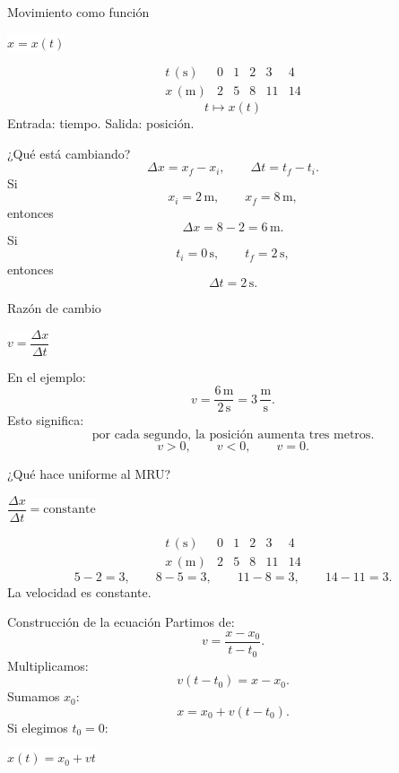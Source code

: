 \documentclass[aspectratio=169,11pt]{beamer}
\newcommand{\caja}[1]{%
  \begin{center}
  \setlength{\fboxsep}{9pt}
  \colorbox{white}{\(\displaystyle \boxed{#1}\)}
  \end{center}
}
\begin{document}
\begin{frame}{Movimiento como función}
  \caja{x=x(t)}
  \[
  \begin{array}{c|ccccc}
  t\,(\mathrm{s}) & 0 & 1 & 2 & 3 & 4\\
  \hline
  x\,(\mathrm{m}) & 2 & 5 & 8 & 11 & 14
  \end{array}
  \]
  \[
    t\longmapsto x(t)
  \]
  Entrada: tiempo. \qquad Salida: posición.
\end{frame}

\begin{frame}{¿Qué está cambiando?}
  \[
    \Delta x=x_f-x_i,
    \qquad
    \Delta t=t_f-t_i.
  \]
  Si
  \[
    x_i=2\,\mathrm{m},\qquad x_f=8\,\mathrm{m},
  \]
  entonces
  \[
    \Delta x=8-2=6\,\mathrm{m}.
  \]
  Si
  \[
    t_i=0\,\mathrm{s},\qquad t_f=2\,\mathrm{s},
  \]
  entonces
  \[
    \Delta t=2\,\mathrm{s}.
  \]
\end{frame}

\begin{frame}{Razón de cambio}
  \caja{v=\dfrac{\Delta x}{\Delta t}}
  En el ejemplo:
  \[
    v=\frac{6\,\mathrm{m}}{2\,\mathrm{s}}
    =3\,\frac{\mathrm{m}}{\mathrm{s}}.
  \]
  Esto significa:
  \[
    \text{por cada segundo, la posición aumenta tres metros}.
  \]
  \[
    v>0,\qquad v<0,\qquad v=0.
  \]
\end{frame}

\begin{frame}{¿Qué hace uniforme al MRU?}
  \caja{\dfrac{\Delta x}{\Delta t}=\text{constante}}
  \[
  \begin{array}{c|ccccc}
  t\,(\mathrm{s}) & 0 & 1 & 2 & 3 & 4\\
  \hline
  x\,(\mathrm{m}) & 2 & 5 & 8 & 11 & 14
  \end{array}
  \]
  \[
    5-2=3,\qquad 8-5=3,\qquad 11-8=3,\qquad 14-11=3.
  \]
  La velocidad es constante.
\end{frame}

\begin{frame}{Construcción de la ecuación}
  Partimos de:
  \[
    v=\frac{x-x_0}{t-t_0}.
  \]
  Multiplicamos:
  \[
    v(t-t_0)=x-x_0.
  \]
  Sumamos \(x_0\):
  \[
    x=x_0+v(t-t_0).
  \]
  Si elegimos \(t_0=0\):
  \caja{x(t)=x_0+vt}
\end{frame}
\end{document}

